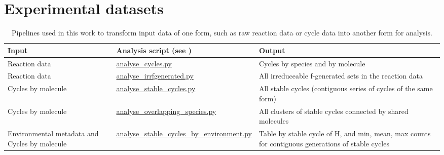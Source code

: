 \chapter{Experimental datasets}\label{datasets}



\begin{table}
	\scriptsize
	\begin{center}
		\caption{Pipelines used in this work to transform input data of one form, such as raw reaction data or cycle data into another form for analysis.}\label{tbl:datasets}
		\begin{tabular}{p{4cm}p{4cm}p{5cm}}
			\toprule
			Input & Analysis script (see \cite{toyworld2}) & Output\\
			\midrule
			Reaction data 									& \url{analyse_cycles.py}						& Cycles by species and by molecule \\
			Reaction data									& \url{analyse_irrfgenerated.py}				& All irreduceable f-generated sets in the reaction data\\
			\midrule
			Cycles by molecule								& \url{analyse_stable_cycles.py}				& All stable cycles (contiguous series of cycles of the same form)\\
			Cycles by molecule								& \url{analyse_overlapping_species.py}			& All clusters of stable cycles connected by shared molecules\\
			Environmental metadata and Cycles by molecule	& \url{analyse_stable_cycles_by_environment.py}	& Table by stable cycle of H, and min, mean, max counts for contiguous generations of stable cycles\\
			\bottomrule
		\end{tabular}
	\end{center}
\end{table}



